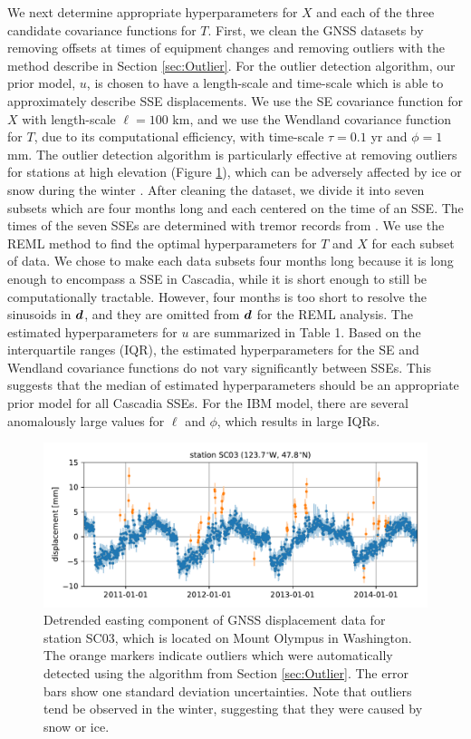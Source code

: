 \documentclass[extra,mreferee]{gji}
\begin{document}
We next determine appropriate hyperparameters for $X$ and each of the three candidate covariance functions for $T$. First, we clean the GNSS datasets by removing offsets at times of equipment changes and removing outliers with the method describe in Section \ref{sec:Outlier}. For the outlier detection algorithm, our prior model, $u$, is chosen to have a length-scale and time-scale which is able to approximately describe SSE displacements. We use the SE covariance function for $X$ with length-scale $\ell = 100$ km, and we use the Wendland covariance function for $T$, due to its computational efficiency, with time-scale $\tau = 0.1$ yr and $\phi = 1$ mm.  The outlier detection algorithm is particularly effective at removing outliers for stations at high elevation (Figure \ref{fig:Outliers}), which can be adversely affected by ice or snow during the winter \citep{Lisowski2008}. After cleaning the dataset, we divide it into seven subsets which are four months long and each centered on the time of an SSE. The times of the seven SSEs are determined with tremor records from \cite{Wech2010}. We use the REML method to find the optimal hyperparameters for $T$ and $X$ for each subset of data. We chose to make each data subsets four months long because it is long enough to encompass a SSE in Cascadia, while it is short enough to still be computationally tractable. However, four months is too short to resolve the sinusoids in $\mitbf{d}$, and they are omitted from $\mitbf{d}$ for the REML analysis. The estimated hyperparameters for $u$ are summarized in Table 1. Based on the interquartile ranges (IQR), the estimated hyperparameters for the SE and Wendland covariance functions do not vary significantly between SSEs. This suggests that the median of estimated hyperparameters should be an appropriate prior model for all Cascadia SSEs. For the IBM model, there are several anomalously large values for $\ell$ and $\phi$, which results in large IQRs.   

\begin{figure}
\includegraphics{figures/outliers/outliers.pdf}
\caption{Detrended easting component of GNSS displacement data for station SC03, which is located on Mount Olympus in Washington. The orange markers indicate outliers which were automatically detected using the algorithm from Section \ref{sec:Outlier}. The error bars show one standard deviation uncertainties. Note that outliers tend be observed in the winter, suggesting that they were caused by snow or ice.}   
\label{fig:Outliers}
\end{figure}
\end{document}
